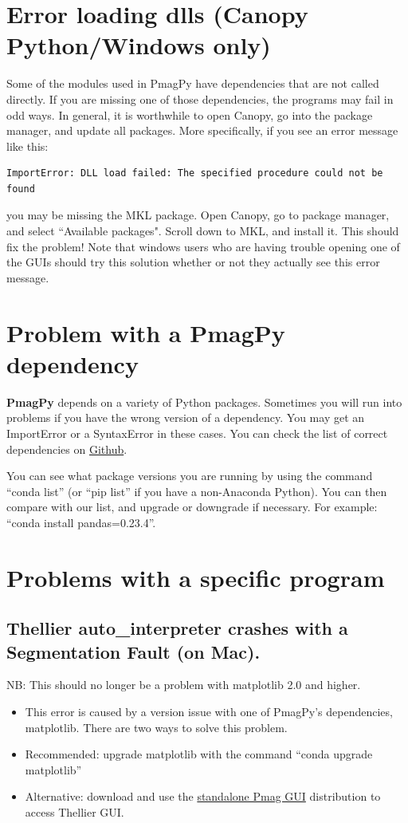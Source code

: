 \documentclass[11pt]{book}
\begin{document}
{{\section{Error loading dlls (Canopy Python/Windows only)}
Some of the modules used in PmagPy have dependencies that are not called directly.  If you are missing one of those dependencies, the programs may fail in odd ways.  In general, it is worthwhile to open Canopy, go into the package manager, and update all packages.  More specifically, if you see an error message like this: \begin{verbatim}ImportError: DLL load failed: The specified procedure could not be found  \end{verbatim} you may be missing the MKL package.  Open Canopy, go to package manager, and select ``Available packages".  Scroll down to MKL, and install it.  This should fix the problem!  Note that windows users who are having trouble opening one of the GUIs should try this solution whether or not they actually see this error message.

\section{Problem with a PmagPy dependency}

{\bf PmagPy} depends on a variety of Python packages.  Sometimes you will run into problems if you have the wrong version of a dependency.  You may get an ImportError or a SyntaxError in these cases.  You can check the list of correct dependencies on \href{https://github.com/PmagPy/PmagPy/blob/master/environment.yml}{Github}.

You can see what package versions you are running by using the command ``conda list'' (or ``pip list'' if you have a non-Anaconda Python).  You can then compare with our list, and upgrade or downgrade if necessary.  For example: ``conda install pandas=0.23.4''.

\section{Problems with a specific program}
\subsection{Thellier auto\_interpreter crashes with a Segmentation Fault (on Mac).}

NB: This should no longer be a problem with matplotlib 2.0 and higher.
  \begin{itemize}
  \item This error is caused by a version issue with one of PmagPy's dependencies, matplotlib.  There are two ways to solve this problem.
  \item Recommended: upgrade matplotlib with the command ``conda upgrade matplotlib''
  \item Alternative: download and use the \href{#standalone}{standalone Pmag GUI} distribution to access Thellier GUI.
  \end{itemize}


}}
\end{document}
